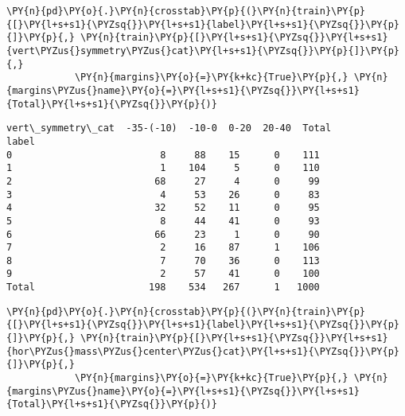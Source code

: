     \begin{tcolorbox}[breakable, size=fbox, boxrule=1pt, pad at break*=1mm,colback=cellbackground, colframe=cellborder]
\begin{Verbatim}[commandchars=\\\{\}]
\PY{n}{pd}\PY{o}{.}\PY{n}{crosstab}\PY{p}{(}\PY{n}{train}\PY{p}{[}\PY{l+s+s1}{\PYZsq{}}\PY{l+s+s1}{label}\PY{l+s+s1}{\PYZsq{}}\PY{p}{]}\PY{p}{,} \PY{n}{train}\PY{p}{[}\PY{l+s+s1}{\PYZsq{}}\PY{l+s+s1}{vert\PYZus{}symmetry\PYZus{}cat}\PY{l+s+s1}{\PYZsq{}}\PY{p}{]}\PY{p}{,} 
            \PY{n}{margins}\PY{o}{=}\PY{k+kc}{True}\PY{p}{,} \PY{n}{margins\PYZus{}name}\PY{o}{=}\PY{l+s+s1}{\PYZsq{}}\PY{l+s+s1}{Total}\PY{l+s+s1}{\PYZsq{}}\PY{p}{)}
\end{Verbatim}
\end{tcolorbox}

            \begin{tcolorbox}[breakable, size=fbox, boxrule=.5pt, pad at break*=1mm, opacityfill=0]
\begin{Verbatim}[commandchars=\\\{\}]
vert\_symmetry\_cat  -35-(-10)  -10-0  0-20  20-40  Total
label
0                          8     88    15      0    111
1                          1    104     5      0    110
2                         68     27     4      0     99
3                          4     53    26      0     83
4                         32     52    11      0     95
5                          8     44    41      0     93
6                         66     23     1      0     90
7                          2     16    87      1    106
8                          7     70    36      0    113
9                          2     57    41      0    100
Total                    198    534   267      1   1000
\end{Verbatim}
\end{tcolorbox}
        
    \begin{tcolorbox}[breakable, size=fbox, boxrule=1pt, pad at break*=1mm,colback=cellbackground, colframe=cellborder]
\begin{Verbatim}[commandchars=\\\{\}]
\PY{n}{pd}\PY{o}{.}\PY{n}{crosstab}\PY{p}{(}\PY{n}{train}\PY{p}{[}\PY{l+s+s1}{\PYZsq{}}\PY{l+s+s1}{label}\PY{l+s+s1}{\PYZsq{}}\PY{p}{]}\PY{p}{,} \PY{n}{train}\PY{p}{[}\PY{l+s+s1}{\PYZsq{}}\PY{l+s+s1}{hor\PYZus{}mass\PYZus{}center\PYZus{}cat}\PY{l+s+s1}{\PYZsq{}}\PY{p}{]}\PY{p}{,} 
            \PY{n}{margins}\PY{o}{=}\PY{k+kc}{True}\PY{p}{,} \PY{n}{margins\PYZus{}name}\PY{o}{=}\PY{l+s+s1}{\PYZsq{}}\PY{l+s+s1}{Total}\PY{l+s+s1}{\PYZsq{}}\PY{p}{)}
\end{Verbatim}
\end{tcolorbox}

